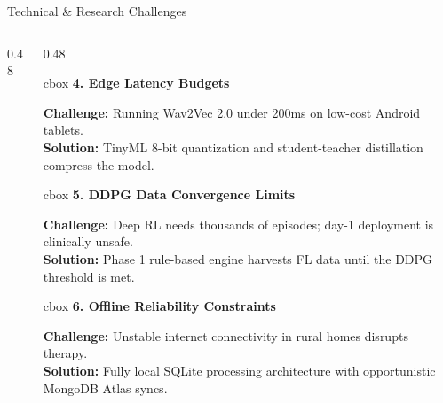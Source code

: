 \documentclass[aspectratio=169, 11pt, xcolor=table]{beamer}
\begin{document}
\begin{frame}{Technical \& Research Challenges}
\begin{columns}[T]
\begin{column}{0.48\textwidth}
        \end{column}

        \begin{column}{0.48\textwidth}
            
            \begin{beamercolorbox}[wd=\linewidth, sep=3pt, rounded=true]{cbox}
                \textbf{\textcolor{amritaMaroon}{\footnotesize 4. Edge Latency Budgets}} \\[1mm]
                {\scriptsize \textbf{Challenge:} Running Wav2Vec 2.0 under 200ms on low-cost Android tablets.\\
                \textbf{Solution:} TinyML 8-bit quantization and student-teacher distillation compress the model.\par}
            \end{beamercolorbox}
            \vspace{2mm}
            
            \begin{beamercolorbox}[wd=\linewidth, sep=3pt, rounded=true]{cbox}
                \textbf{\textcolor{amritaMaroon}{\footnotesize 5. DDPG Data Convergence Limits}} \\[1mm]
                {\scriptsize \textbf{Challenge:} Deep RL needs thousands of episodes; day-1 deployment is clinically unsafe.\\
                \textbf{Solution:} Phase 1 rule-based engine harvests FL data until the DDPG threshold is met.\par}
            \end{beamercolorbox}
            \vspace{2mm}
            
            \begin{beamercolorbox}[wd=\linewidth, sep=3pt, rounded=true]{cbox}
                \textbf{\textcolor{amritaMaroon}{\footnotesize 6. Offline Reliability Constraints}} \\[1mm]
                {\scriptsize \textbf{Challenge:} Unstable internet connectivity in rural homes disrupts therapy.\\
                \textbf{Solution:} Fully local SQLite processing architecture with opportunistic MongoDB Atlas syncs.\par}
            \end{beamercolorbox}
            
        \end{column}
    \end{columns}
\end{frame}
\end{document}
